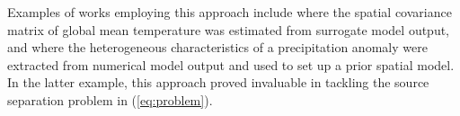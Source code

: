\documentclass[10pt,a4paper]{article}
\begin{document}
%

Examples of works employing this approach include \cite{Berliner_2000} where the spatial covariance matrix of global mean temperature was estimated from surrogate model output, and \cite{Zammit_2014} where the heterogeneous characteristics of a precipitation anomaly were extracted from numerical model output and used to set up a prior spatial model. In the latter example, this approach proved invaluable in tackling the source separation problem in (\ref{eq:problem}).
\end{document}
